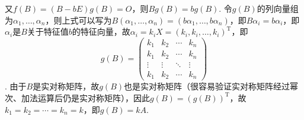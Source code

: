 \documentclass[UTF8,12pt,a4paper,fontset=fandol]{ctexart}
\begin{document}
\begin{solve}
\begin{enumerate}
                      又$f(B)=(B-bE)g(B)=O$，则$Bg(B)=bg(B)$. 令$g(B)$的列向量组为$\alpha_1,\ldots,\alpha_n$，则上式可以写为$B(\alpha_1,\ldots,\alpha_n)=(b\alpha_1,\ldots,b\alpha_n)$，即$B\alpha_i=b\alpha_i$，即$\alpha_i$是$B$关于特征值$b$的特征向量，故$\alpha_i=k_iX=(k_i,k_i,\ldots,k_i)^{\mathrm{T}}$，即
\[g(B)=\begin{pmatrix}
                              k_1 & k_2 & \cdots & k_n \\ k_1 & k_2 & \cdots & k_n \\ \vdots & \vdots & \ddots & \vdots \\ k_1 & k_2 & \cdots & k_n
                          \end{pmatrix}\]
. 由于$B$是实对称矩阵，故$g(B)$也是实对称矩阵（很容易验证实对称矩阵经过幂次、加法运算后仍是实对称矩阵），因此$g(B)=(g(B))^\mathrm{T}$，故$k_1=k_2=\cdots=k_n=k$，即$g(B)=kA$.
            \end{enumerate}
\end{solve}
\end{document}
